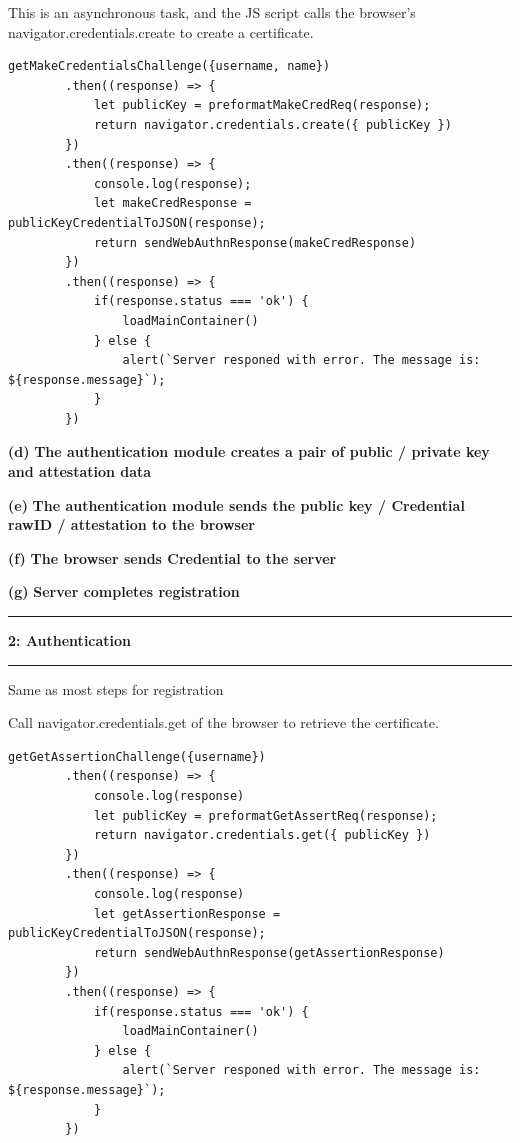 \documentclass[11pt]{article}
\newcommand\question[2]{\vspace{.25in}\hrule\textbf{#1: #2}\vspace{.5em}\hrule\vspace{.10in}}
\renewcommand\part[1]{\vspace{.10in}\textbf{(#1)}}
\begin{document}
This is an asynchronous task, and the JS script calls the browser's navigator.credentials.create to create a certificate.

\begin{lstlisting}
getMakeCredentialsChallenge({username, name})
        .then((response) => {
            let publicKey = preformatMakeCredReq(response);
            return navigator.credentials.create({ publicKey })
        })
        .then((response) => {
            console.log(response);
            let makeCredResponse = publicKeyCredentialToJSON(response);
            return sendWebAuthnResponse(makeCredResponse)
        })
        .then((response) => {
            if(response.status === 'ok') {
                loadMainContainer()   
            } else {
                alert(`Server responed with error. The message is: ${response.message}`);
            }
        })

\end{lstlisting}

\part{d} \textbf{The authentication module creates a pair of public / private key and attestation data}

\part{e} \textbf{The authentication module sends the public key / Credential rawID / attestation to the browser}

\part{f} \textbf{The browser sends Credential to the server}

\part{g} \textbf{Server completes registration}



\question{2}{Authentication}

Same as most steps for registration

Call navigator.credentials.get of the browser to retrieve the certificate.

\begin{lstlisting}
getGetAssertionChallenge({username})
        .then((response) => {
            console.log(response)
            let publicKey = preformatGetAssertReq(response);
            return navigator.credentials.get({ publicKey })
        })
        .then((response) => {
            console.log(response)
            let getAssertionResponse = publicKeyCredentialToJSON(response);
            return sendWebAuthnResponse(getAssertionResponse)
        })
        .then((response) => {
            if(response.status === 'ok') {
                loadMainContainer()   
            } else {
                alert(`Server responed with error. The message is: ${response.message}`);
            }
        })

\end{lstlisting}
\end{document}
